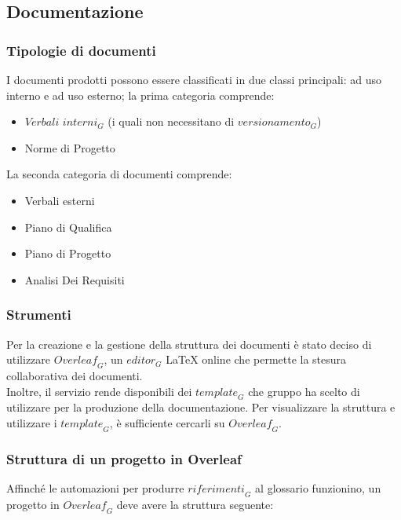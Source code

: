 \subsection{Documentazione}


\subsubsection{Tipologie di documenti}
I documenti prodotti possono essere classificati in due classi principali: ad uso interno e ad uso esterno; la prima categoria comprende:
\begin{itemize}
    \item $\textit{Verbali interni}_G$ (i quali non necessitano di $\textit{versionamento}_G$)
    \item Norme di Progetto
\end{itemize}
La seconda categoria di documenti comprende:
\begin{itemize}
    \item Verbali esterni
    \item Piano di Qualifica
    \item Piano di Progetto
    \item Analisi Dei Requisiti
\end{itemize}

\subsubsection{Strumenti}
Per la creazione e la gestione della struttura dei documenti è stato deciso di utilizzare $\textit{Overleaf}_G$, un $\textit{editor}_G$ LaTeX online che permette la stesura collaborativa dei documenti. \\
Inoltre, il servizio rende disponibili dei $\textit{template}_G$ che gruppo ha scelto di utilizzare per la produzione della documentazione. Per visualizzare la struttura e utilizzare i $\textit{template}_G$, è sufficiente cercarli su $\textit{Overleaf}_G$.

\subsubsection{Struttura di un progetto in Overleaf}
Affinché le automazioni per produrre $\textit{riferimenti}_G$ al glossario funzionino, un progetto in $\textit{Overleaf}_G$ deve avere la struttura seguente:

